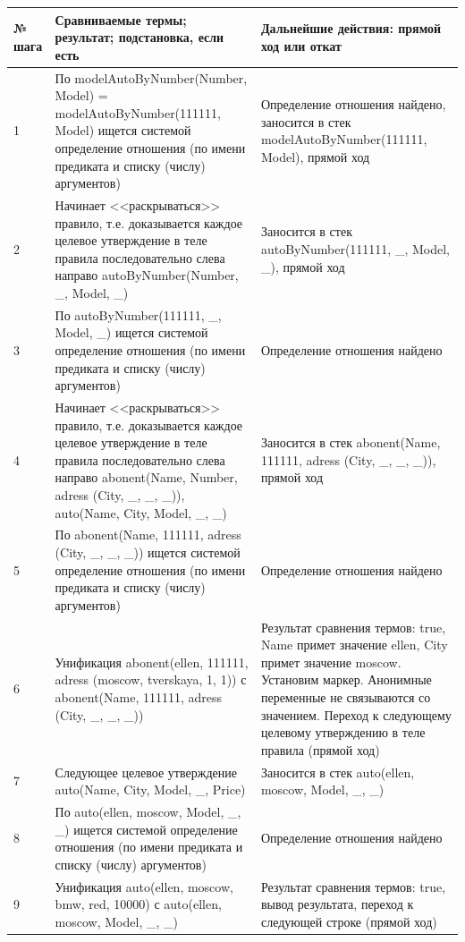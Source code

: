 \documentclass[a4paper,14pt]{extreport} %
\begin{document}
\begin{enumerate}
\begin{longtable}{|p{1.1cm}|p{8.5cm}|p{7cm}|}
	\hline
 	№ шага & Сравниваемые термы; результат; подстановка, если есть  & Дальнейшие действия: прямой ход или откат \\ \hline
	1 & По modelAutoByNumber(Number, Model) = modelAutoByNumber(111111, Model) ищется системой определение отношения (по имени предиката и списку (числу) аргументов) & Определение отношения найдено, заносится в стек modelAutoByNumber(111111, Model), прямой ход \\ \hline
	2 & Начинает <<раскрываться>> правило, т.е. доказывается каждое целевое утверждение в теле правила последовательно слева направо autoByNumber(Number, \_, Model, \_)
	& Заносится в стек autoByNumber(111111, \_, Model, \_), прямой ход \\ \hline
	3 & По autoByNumber(111111, \_, Model, \_) ищется системой определение отношения (по имени предиката и списку (числу) аргументов) & Определение отношения найдено \\ \hline
	4 & Начинает <<раскрываться>> правило, т.е. доказывается каждое целевое утверждение в теле правила последовательно слева направо abonent(Name, Number, adress (City, \_, \_, \_)), auto(Name, City, Model, \_, \_)
	& Заносится в стек abonent(Name, 111111, adress (City, \_, \_, \_)), прямой ход \\ \hline
	5 & По abonent(Name, 111111, adress (City, \_, \_, \_)) ищется системой определение отношения (по имени предиката и списку (числу) аргументов) & Определение отношения найдено \\ \hline
	6 & Унификация abonent(ellen, 111111, adress (moscow, tverskaya, 1, 1)) с abonent(Name, 111111, adress (City, \_, \_, \_)) & Результат сравнения термов: true, Name примет значение ellen, City примет значение moscow. Установим маркер. Анонимные переменные не связываются со значением. Переход к следующему целевому утверждению в теле правила (прямой ход) \\ \hline
	7 & Следующее целевое утверждение auto(Name, City, Model, \_, Price) & Заносится в стек auto(ellen, moscow, Model, \_, \_)  \\ \hline
	8 & По auto(ellen, moscow, Model, \_, \_) ищется системой определение отношения (по имени предиката и списку (числу) аргументов) & Определение отношения найдено \\ \hline
	9 & Унификация auto(ellen, moscow, bmw, red, 10000) с auto(ellen, moscow, Model, \_, \_) & Результат сравнения термов: true, вывод результата, переход к следующей строке (прямой ход) \\ \hline

\end{longtable}
\end{enumerate}
\end{document}
